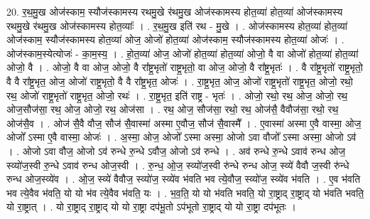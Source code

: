 \documentclass[17pt]{extarticle}
\begin{document}
20. र॒थ॒मु॒ख ओज॑स्काम॒ स्यौज॑स्कामस्य रथमु॒खे र॑थमु॒ख ओज॑स्कामस्य होत॒व्या॑ होत॒व्या॑ ओज॑स्कामस्य रथमु॒खे र॑थमु॒ख ओज॑स्कामस्य होत॒व्याः᳚ । . र॒थ॒मु॒ख इति॑ रथ - मु॒खे । . ओज॑स्कामस्य होत॒व्या॑ होत॒व्या॑ ओज॑स्काम॒ स्यौज॑स्कामस्य होत॒व्या॑ ओज॒ ओजो॑ होत॒व्या॑ ओज॑स्काम॒
स्यौज॑स्कामस्य होत॒व्या॑ ओजः॑ । . ओज॑स्काम॒स्येत्योजः॑ - का॒म॒स्य॒ । . हो॒त॒व्या॑ ओज॒ ओजो॑ होत॒व्या॑ होत॒व्या॑ ओजो॒ वै वा ओजो॑ होत॒व्या॑ होत॒व्या॑ ओजो॒ वै । . ओजो॒ वै वा ओज॒ ओजो॒ वै रा᳚ष्ट्र॒भृतो॑ राष्ट्र॒भृतो॒ वा ओज॒ ओजो॒ वै रा᳚ष्ट्र॒भृतः॑ । . वै रा᳚ष्ट्र॒भृतो॑ राष्ट्र॒भृतो॒ वै वै रा᳚ष्ट्र॒भृत॒ ओज॒ ओजो॑ राष्ट्र॒भृतो॒ वै वै रा᳚ष्ट्र॒भृत॒ ओजः॑ । . रा॒ष्ट्र॒भृत॒ ओज॒ ओजो॑ राष्ट्र॒भृतो॑ राष्ट्र॒भृत॒ ओजो॒ रथो॒ रथ॒ ओजो॑ राष्ट्र॒भृतो॑ राष्ट्र॒भृत॒ ओजो॒ रथः॑ । . रा॒ष्ट्र॒भृत॒ इति॑ राष्ट्र - भृतः॑ । . ओजो॒ रथो॒ रथ॒ ओज॒ ओजो॒ रथ॒ ओज॒सौज॑सा॒ रथ॒ ओज॒ ओजो॒ रथ॒ ओज॑सा । . रथ॒ ओज॒ सौज॑सा॒ रथो॒ रथ॒ ओज॑सै॒ वैवौज॑सा॒ रथो॒ रथ॒ ओज॑सै॒व । . ओज॑ सै॒वै वौज॒ सौज॑ सै॒वास्मा॑ अस्मा ए॒वौज॒ सौज॑ सै॒वास्मै᳚ । . ए॒वास्मा॑ अस्मा ए॒वै वास्मा॒ ओज॒ ओजो᳚ ऽस्मा ए॒वै वास्मा॒ ओजः॑ । . अ॒स्मा॒ ओज॒ ओजो᳚ ऽस्मा अस्मा॒ ओजो ऽवा वौजो᳚ ऽस्मा अस्मा॒ ओजो ऽव॑ । . ओजो ऽवा वौज॒ ओजो ऽव॑ रुन्धे रु॒न्धे ऽवौज॒ ओजो ऽव॑ रुन्धे । . अव॑ रुन्धे रु॒न्धे ऽवाव॑ रुन्ध ओज॒ स्व्यो॑ज॒स्वी रु॒न्धे ऽवाव॑ रुन्ध ओज॒स्वी । . रु॒न्ध॒ ओ॒ज॒ स्व्यो॑ज॒स्वी रु॑न्धे रुन्ध ओज॒ स्व्ये॑ वैवौ ज॒स्वी रु॑न्धे रुन्ध ओज॒स्व्ये॑व । . ओ॒ज॒ स्व्ये॑ वैवौज॒ स्व्यो॑ज॒ स्व्ये॑व भ॑वति भव त्ये॒वौज॒ स्व्यो॑ज॒ स्व्ये॑व भ॑वति । . ए॒व भ॑वति भव त्ये॒वैव भ॑वति॒ यो यो भ॑व त्ये॒वैव भ॑वति॒ यः । . भ॒व॒ति॒ यो यो भ॑वति भवति॒ यो रा॒ष्ट्राद् रा॒ष्ट्राद् यो भ॑वति भवति॒ यो रा॒ष्ट्रात् । . यो रा॒ष्ट्राद् रा॒ष्ट्राद् यो यो रा॒ष्ट्रा दप॑भू॒तो ऽप॑भूतो रा॒ष्ट्राद् यो यो रा॒ष्ट्रा दप॑भूतः । \newline
\end{document}

